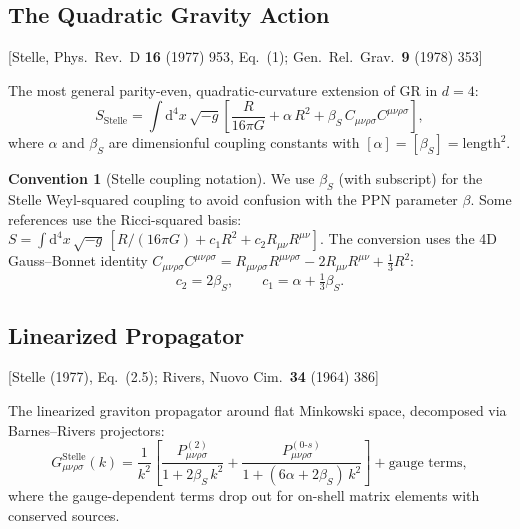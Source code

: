 \documentclass[11pt,a4paper]{article}
\theoremstyle{plain}
\theoremstyle{definition}
\newtheorem{convention}[theorem]{Convention}
\theoremstyle{remark}
\newcommand{\dd}{\mathrm{d}}
\newcommand{\fromlit}[1]{\textcolor{sctblue}{\textsf{[#1]}}}
\begin{document}
\subsection{The Quadratic Gravity Action}

\fromlit{Stelle, Phys.\ Rev.\ D \textbf{16} (1977) 953, Eq.~(1);
Gen.\ Rel.\ Grav.\ \textbf{9} (1978) 353}

The most general parity-even, quadratic-curvature extension of GR
in $d = 4$:
\begin{equation}\label{eq:stelle-action}
  S_{\mathrm{Stelle}} = \int \dd^4 x\,\sqrt{-g}\left[
    \frac{R}{16\pi G}
    + \alpha\, R^2
    + \beta_S\, C_{\mu\nu\rho\sigma}C^{\mu\nu\rho\sigma}
  \right],
\end{equation}
where $\alpha$ and $\beta_S$ are dimensionful coupling constants
with $[\alpha] = [\beta_S] = \mathrm{length}^2$.

\begin{convention}[Stelle coupling notation]\label{conv:stelle-couplings}
We use $\beta_S$ (with subscript) for the Stelle Weyl-squared
coupling to avoid confusion with the PPN parameter $\beta$.
Some references use the Ricci-squared basis:
$S = \int \dd^4 x\,\sqrt{-g}\,[R/(16\pi G)
+ c_1 R^2 + c_2 R_{\mu\nu}R^{\mu\nu}]$.
The conversion uses the 4D Gauss--Bonnet identity
$C_{\mu\nu\rho\sigma}C^{\mu\nu\rho\sigma}
= R_{\mu\nu\rho\sigma}R^{\mu\nu\rho\sigma}
- 2R_{\mu\nu}R^{\mu\nu} + \tfrac{1}{3}R^2$:
\begin{equation}\label{eq:stelle-basis}
  c_2 = 2\beta_S,\qquad
  c_1 = \alpha + \tfrac{1}{3}\beta_S.
\end{equation}
\end{convention}

\subsection{Linearized Propagator}

\fromlit{Stelle (1977), Eq.~(2.5); Rivers, Nuovo Cim.\ \textbf{34} (1964) 386}

The linearized graviton propagator around flat Minkowski space,
decomposed via Barnes--Rivers projectors:
\begin{equation}\label{eq:stelle-prop}
  G_{\mu\nu\rho\sigma}^{\mathrm{Stelle}}(k)
  = \frac{1}{k^2}\left[
    \frac{P^{(2)}_{\mu\nu\rho\sigma}}{1 + 2\beta_S\, k^2}
    + \frac{P^{(0\text{-}s)}_{\mu\nu\rho\sigma}}
           {1 + (6\alpha + 2\beta_S)\,k^2}
  \right]
  + \text{gauge terms},
\end{equation}
where the gauge-dependent terms drop out for on-shell matrix elements
with conserved sources.
\end{document}
